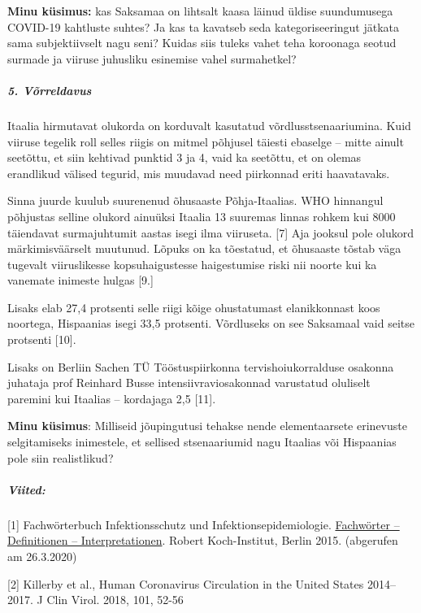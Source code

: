 \textbf{Minu küsimus:} kas Saksamaa on lihtsalt kaasa läinud üldise
suundumusega COVID-19 kahtluste suhtes? Ja kas ta kavatseb seda
kategoriseeringut jätkata sama subjektiivselt nagu seni? Kuidas siis
tuleks vahet teha koroonaga seotud surmade ja viiruse juhusliku
esinemise vahel surmahetkel?

\hypertarget{5-vuxf5rreldavus}{%
\subparagraph{\texorpdfstring{\textbf{5.
Võrreldavus}}{5. Võrreldavus}}\label{5-vuxf5rreldavus}}

Itaalia hirmutavat olukorda on korduvalt kasutatud
võrdlusstsenaariumina. Kuid viiruse tegelik roll selles riigis on mitmel
põhjusel täiesti ebaselge -- mitte ainult seetõttu, et siin kehtivad
punktid 3 ja 4, vaid ka seetõttu, et on olemas erandlikud välised
tegurid, mis muudavad need piirkonnad eriti haavatavaks.

Sinna juurde kuulub suurenenud õhusaaste Põhja-Itaalias. WHO hinnangul
põhjustas selline olukord ainuüksi Itaalia 13 suuremas linnas rohkem kui
8000 täiendavat surmajuhtumit aastas isegi ilma viiruseta. {[}7{]} Aja
jooksul pole olukord märkimisväärselt muutunud. Lõpuks on ka tõestatud,
et õhusaaste tõstab väga tugevalt viiruslikesse kopsuhaigustesse
haigestumise riski nii noorte kui ka vanemate inimeste hulgas {[}9.{]}

Lisaks elab 27,4 protsenti selle riigi kõige ohustatumast elanikkonnast
koos noortega, Hispaanias isegi 33,5 protsenti. Võrdluseks on see
Saksamaal vaid seitse protsenti {[}10{]}.

Lisaks on Berliin Sachen TÜ Tööstuspiirkonna tervishoiukorralduse
osakonna juhataja prof Reinhard Busse intensiivraviosakonnad varustatud
oluliselt paremini kui Itaalias -- kordajaga 2,5 {[}11{]}.

\textbf{Minu küsimus}: Milliseid jõupingutusi tehakse nende
elementaarsete erinevuste selgitamiseks inimestele, et sellised
stsenaariumid nagu Itaalias või Hispaanias pole siin realistlikud?

\hypertarget{viited}{%
\subparagraph{\texorpdfstring{\textbf{Viited:}}{Viited:}}\label{viited}}

{[}1{]} Fachwörterbuch Infektionsschutz und Infektionsepidemiologie.
\href{https://www.rki.de/DE/Content/Service/Publikationen/Fachwoerterbuch_Infektionsschutz.html}{Fachwörter
-- Definitionen -- Interpretationen}. Robert Koch-Institut, Berlin 2015.
(abgerufen am 26.3.2020)

{[}2{]} Killerby et al., Human Coronavirus Circulation in the United
States 2014--2017. J Clin Virol. 2018, 101, 52-56

